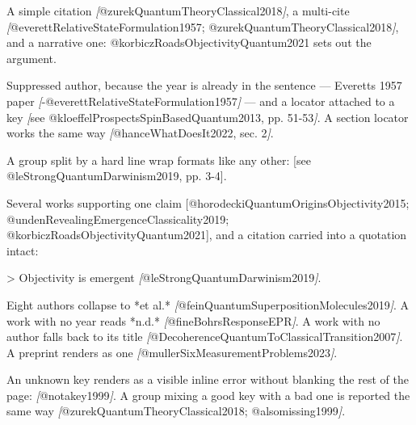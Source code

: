 \documentclass[
]{article}
\newenvironment{Shaded}{}{}
\newcommand{\AttributeTok}[1]{\textcolor[rgb]{0.49,0.56,0.16}{#1}}
\newcommand{\CommentTok}[1]{\textcolor[rgb]{0.38,0.63,0.69}{\textit{#1}}}
\newcommand{\NormalTok}[1]{#1}
\newcommand{\OtherTok}[1]{\textcolor[rgb]{0.00,0.44,0.13}{#1}}
\begin{document}
\begin{Shaded}
\begin{Highlighting}[]
\NormalTok{A simple citation }\CommentTok{[}\OtherTok{@zurekQuantumTheoryClassical2018}\CommentTok{]}\NormalTok{, a multi{-}cite}
\CommentTok{[}\OtherTok{@everettRelativeStateFormulation1957; @zurekQuantumTheoryClassical2018}\CommentTok{]}\NormalTok{, and a}
\NormalTok{narrative one: @korbiczRoadsObjectivityQuantum2021 sets out the argument.}

\NormalTok{Suppressed author, because the year is already in the sentence — Everett\textquotesingle{}s 1957}
\NormalTok{paper }\CommentTok{[}\OtherTok{{-}@everettRelativeStateFormulation1957}\CommentTok{]}\NormalTok{ — and a locator attached to a key}
\CommentTok{[}\OtherTok{see @kloeffelProspectsSpinBasedQuantum2013, pp. 51{-}53}\CommentTok{]}\NormalTok{. A section locator}
\NormalTok{works the same way }\CommentTok{[}\OtherTok{@hanceWhatDoesIt2022, sec. 2}\CommentTok{]}\NormalTok{.}

\NormalTok{A group split by a hard line wrap formats like any other: [see}
\NormalTok{@leStrongQuantumDarwinism2019, pp. 3{-}4].}

\NormalTok{Several works supporting one claim [@horodeckiQuantumOriginsObjectivity2015;}
\NormalTok{@undenRevealingEmergenceClassicality2019; @korbiczRoadsObjectivityQuantum2021],}
\NormalTok{and a citation carried into a quotation intact:}

\AttributeTok{\textgreater{} Objectivity is emergent }\CommentTok{[}\OtherTok{@leStrongQuantumDarwinism2019}\CommentTok{]}\AttributeTok{.}

\NormalTok{Eight authors collapse to *et al.* }\CommentTok{[}\OtherTok{@feinQuantumSuperpositionMolecules2019}\CommentTok{]}\NormalTok{. A}
\NormalTok{work with no year reads *n.d.* }\CommentTok{[}\OtherTok{@fineBohrsResponseEPR}\CommentTok{]}\NormalTok{. A work with no author}
\NormalTok{falls back to its title }\CommentTok{[}\OtherTok{@DecoherenceQuantumToClassicalTransition2007}\CommentTok{]}\NormalTok{. A}
\NormalTok{preprint renders as one }\CommentTok{[}\OtherTok{@mullerSixMeasurementProblems2023}\CommentTok{]}\NormalTok{.}

\NormalTok{An unknown key renders as a visible inline error without blanking the rest of}
\NormalTok{the page: }\CommentTok{[}\OtherTok{@notakey1999}\CommentTok{]}\NormalTok{. A group mixing a good key with a bad one is reported}
\NormalTok{the same way }\CommentTok{[}\OtherTok{@zurekQuantumTheoryClassical2018; @alsomissing1999}\CommentTok{]}\NormalTok{.}
\end{Highlighting}
\end{Shaded}
\end{document}
